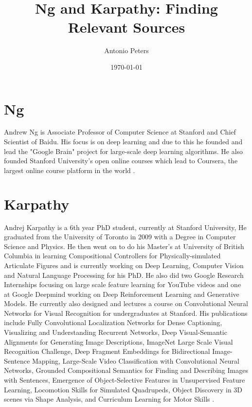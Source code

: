 \documentclass[a4paper]{article}
\title{Ng and Karpathy: Finding Relevant Sources}
\author{Antonio Peters}
\date{\today}
\begin{document}
\maketitle

\section{Ng}

Andrew Ng is Associate Professor of Computer Science at Stanford and Chief Scientist of Baidu. His focus is on deep learning and due to this he founded and lead the "Google Brain" project for large-scale deep learning algorithms. He also founded Stanford University's open online courses which lead to Coursera, the largest online course platform in the world \cite{ng}. 

\section{Karpathy}

Andrej Karpathy is a 6th year PhD student, currently at Stanford University, He graduated from the University of Toronto in 2009 with a Degree in Computer Science and Physics. He then went on to do his Master's at University of British Columbia in learning Compositional Controllers for Physically-simulated Articulate Figures and is currently working on Deep Learning, Computer Vision and Natural Language Processing for his PhD. He also did two Google Research Internships focusing on large scale feature learning for YouTube videos and one at Google Deepmind working on Deep Reinforcement Learning and Generative Models. He currently also designed and lectures a course on Convolutional Neural Networks for Visual Recognition for undergraduates at Stanford. His publications include Fully Convolutional Localization Networks for Dense Captioning, Visualizing and Understanding Recurrent Networks, Deep Visual-Semantic Alignments for Generating Image Descriptions, ImageNet Large Scale Visual Recognition Challenge, Deep Fragment Embeddings for Bidirectional Image-Sentence Mapping, Large-Scale Video Classification with Convolutional Neural Networks, Grounded Compositional Semantics for Finding and Describing Images with Sentences, Emergence of Object-Selective Features in Unsupervised Feature Learning, Locomotion Skills for Simulated Quadrupeds, Object Discovery in 3D scenes via Shape Analysis, and Curriculum Learning for Motor Skills \cite{karathy}.



\end{document}
